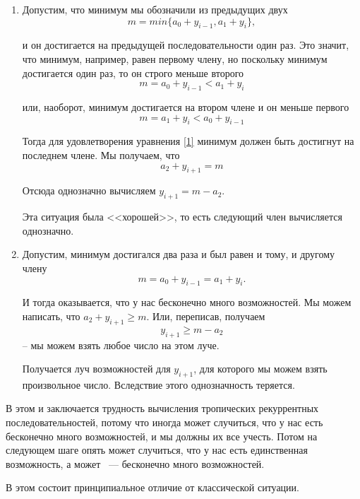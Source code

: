 \documentclass[russian]{lecture-notes}
\begin{document}
\begin{enumerate}
 \item   Допустим, что минимум мы обозначили из предыдущих двух
$$m=min\{{a_0+y_{i-1},a_1+y_i}\},$$

и он достигается на предыдущей последовательности один раз. Это значит, что минимум, например, равен первому члену, но поскольку минимум достигается один раз, то он строго меньше второго
$$m=a_0+y_{i-1}<a_1+y_i$$

или, наоборот, минимум достигается на втором члене и он меньше первого
$$m=a_1+y_i<a_0+y_{i-1}$$

Тогда для удовлетворения уравнения \ref{1} минимум должен быть достигнут на последнем члене. Мы получаем, что
$$a_2+y_{i+1}=m$$

Отсюда однозначно вычисляем $y_{i+1}=m-a_2$.

Эта ситуация была <<хорошей>>, то есть следующий член вычисляется однозначно.

 \item  Допустим, минимум достигался два раза и был равен и тому, и другому члену
$$m=a_0+y_{i-1}=a_1+y_i.$$

И тогда оказывается, что у нас бесконечно много возможностей. Мы можем написать, что $a_2+y_{i+1}\geq m.$
Или, переписав, получаем
$$y_{i+1}\geq m-a_2$$
-- мы можем взять любое число на этом луче.

Получается луч возможностей для $y_{i+1}$, для которого мы можем взять произвольное число. Вследствие этого однозначность теряется.
\end{enumerate}

В этом и заключается трудность вычисления тропических рекуррентных последовательностей, потому что иногда может случиться, что у нас есть бесконечно много возможностей, и мы должны их все учесть. Потом на следующем шаге опять может случиться,  что у нас есть
единственная возможность, а может ~--- бесконечно много возможностей.

В этом состоит принципиальное отличие от классической ситуации.
\end{document}
